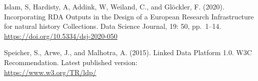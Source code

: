 \begin{thebibliography}{9}
 Islam, S, Hardisty, A, Addink, W, Weiland, C., and Glöckler, F.
(2020). Incorporating RDA Outputs in the Design of a European Research
Infrastructure for natural history Collections. Data Science Journal,
19: 50, pp.~1--14.\\
\url{https://doi.org/10.5334/dsj-2020-050}

 Speicher, S., Arwe, J., and Malhotra, A. (2015). Linked Data
Platform 1.0. W3C Recommendation. Latest published version:\\
\url{https://www.w3.org/TR/ldp/}


\end{thebibliography}

